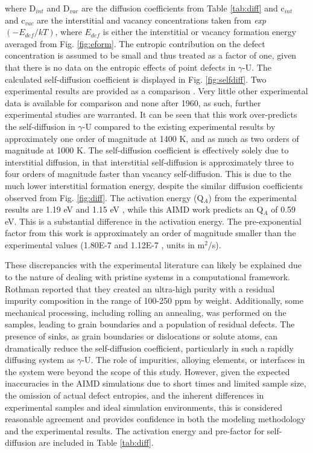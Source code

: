 \documentclass[review]{elsarticle}
\begin{document}
where D$_{int}$ and D$_{vac}$ are the diffusion coefficients from Table \ref{tab:diff} and c$_{int}$ and c$_{vac}$ are the interstitial and vacancy concentrations taken from \textit{exp}$(-E_{def}/kT)$, where $E_{def}$ is either the interstitial or vacancy formation energy averaged from Fig. \ref{fig:eform}. The entropic contribution on the defect concentration is assumed to be small and thus treated as a factor of one, given that there is no data on the entropic effects of point defects in $\gamma$-U. The calculated self-diffusion coefficient is displayed in Fig. \ref{fig:selfdiff}. Two experimental results are provided as a comparison \cite{rothman1959,adda1959}. Very little other experimental data is available for comparison and none after 1960, as such, further experimental studies are warranted. It can be seen that this work over-predicts the self-diffusion in $\gamma$-U compared to the existing experimental results by approximately one order of magnitude at 1400 K, and as much as two orders of magnitude at 1000 K. The self-diffusion coefficient is effectively solely due to interstitial diffusion, in that interstitial self-diffusion is approximately three to four orders of magnitude faster than vacancy self-diffusion. This is due to the much lower interstitial formation energy, despite the similar diffusion coefficients observed from Fig. \ref{fig:diff}. The activation energy (Q$_A$) from the experimental results are 1.19 eV \cite{adda1959} and 1.15 eV \cite{rothman1959}, while this AIMD work predicts an Q$_A$ of 0.59 eV. This is a substantial difference in the activation energy. The pre-exponential factor from this work is approximately an order of magnitude smaller than the experimental values (1.80E-7 \cite{adda1959} and 1.12E-7 \cite{rothman1959}, units in m$^2$/s). 

These discrepancies with the experimental literature can likely be explained due to the nature of dealing with pristine systems in a computational framework. Rothman \cite{rothman1959} reported that they created an ultra-high purity with a residual impurity composition in the range of 100-250 ppm by weight. Additionally, some mechanical processing, including rolling an annealing, was performed on the samples, leading to grain boundaries and a population of residual defects. The presence of sinks, as grain boundaries or dislocations or solute atoms, can dramatically reduce the self-diffusion coefficient, particularly in such a rapidly diffusing system as $\gamma$-U. The role of impurities, alloying elements, or interfaces in the system were beyond the scope of this study. However, given the expected inaccuracies in the AIMD simulations due to short times and limited sample size, the omission of actual defect entropies, and the inherent differences in experimental samples and ideal simulation environments, this is considered reasonable agreement and provides confidence in both the modeling methodology and the experimental results. The activation energy and pre-factor for self-diffusion are included in Table \ref{tab:diff}. 
\end{document}
